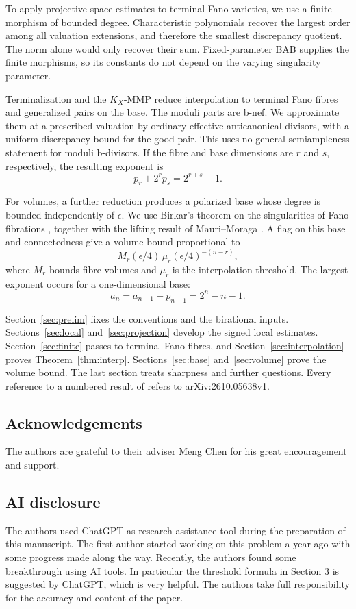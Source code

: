 \documentclass[11pt,reqno]{amsart}
\numberwithin{equation}{section}
\theoremstyle{definition}
\theoremstyle{remark}
\newcommand{\eps}{\epsilon}
\begin{document}
To apply projective-space estimates to terminal Fano varieties, we use a finite morphism of bounded degree. Characteristic polynomials recover the largest order among all valuation extensions, and therefore the smallest discrepancy quotient. The norm alone would only recover their sum. Fixed-parameter BAB supplies the finite morphisms, so its constants do not depend on the varying singularity parameter.

Terminalization and the $K_X$-MMP reduce interpolation to terminal Fano fibres and generalized pairs on the base. The moduli parts are b-nef. We approximate them at a prescribed valuation by ordinary effective anticanonical divisors, with a uniform discrepancy bound for the good pair. This uses no general semiampleness statement for moduli b-divisors. If the fibre and base dimensions are $r$ and $s$, respectively, the resulting exponent is
\[
 p_r+2^rp_s=2^{r+s}-1.
\]

For volumes, a further reduction produces a polarized base whose degree is bounded independently of $\eps$. We use Birkar's theorem on the singularities of Fano fibrations \cite{BirFib}, together with the lifting result of Mauri--Moraga \cite[Lemma~2.11]{MM}. A flag on this base and connectedness give a volume bound proportional to
\[
 M_r(\eps/4)\,\mu_r(\eps/4)^{-(n-r)},
\]
where $M_r$ bounds fibre volumes and $\mu_r$ is the interpolation threshold. The largest exponent occurs for a one-dimensional base:
\[
 a_n=a_{n-1}+p_{n-1}=2^n-n-1.
\]

Section~\ref{sec:prelim} fixes the conventions and the birational inputs. Sections~\ref{sec:local} and~\ref{sec:projection} develop the signed local estimates. Section~\ref{sec:finite} passes to terminal Fano fibres, and Section~\ref{sec:interpolation} proves Theorem~\ref{thm:interp}. Sections~\ref{sec:base} and~\ref{sec:volume} prove the volume bound. The last section treats sharpness and further questions. Every reference to a numbered result of \cite{Jiao} refers to arXiv:2610.05638v1.

\subsection*{Acknowledgements}
The authors are grateful to their adviser Meng Chen for his great encouragement and support.

\subsection*{AI disclosure}
The authors used ChatGPT as research-assistance tool during the preparation of this manuscript. The first author started working on this problem a year ago with some progress made along the way. Recently, the authors found some breakthrough using AI tools. In particular the threshold formula in Section 3 is suggested by ChatGPT, which is very helpful. The authors take full responsibility for the accuracy and content of the paper.
\end{document}
